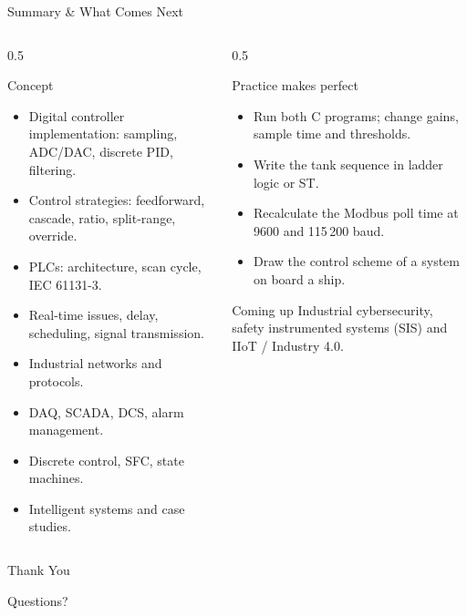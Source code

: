 \documentclass[aspectratio=169]{beamer}
\begin{document}
	\begin{frame}{Summary \& What Comes Next}
		\begin{columns}[T]
			\begin{column}{0.5\textwidth}
				\begin{block}{Concept}
					\begin{itemize}\small
						\item Digital controller implementation: sampling, ADC/DAC, discrete PID, filtering.
						\item Control strategies: feedforward, cascade, ratio, split-range, override.
						\item PLCs: architecture, scan cycle, IEC 61131-3.
						\item Real-time issues, delay, scheduling, signal transmission.
						\item Industrial networks and protocols.
						\item DAQ, SCADA, DCS, alarm management.
						\item Discrete control, SFC, state machines.
						\item Intelligent systems and case studies.
					\end{itemize}
				\end{block}
			\end{column}
			\begin{column}{0.5\textwidth}
				\begin{block}{Practice makes perfect}
					\begin{itemize}\small
						\item Run both C programs; change gains, sample time and thresholds.
						\item Write the tank sequence in ladder logic or ST.
						\item Recalculate the Modbus poll time at 9600 and 115\,200 baud.
						\item Draw the control scheme of a system on board a ship.
					\end{itemize}
				\end{block}
				\begin{block}{Coming up}
					\small Industrial cybersecurity, safety instrumented systems (SIS) and IIoT / Industry 4.0.
				\end{block}
			\end{column}
		\end{columns}
	\end{frame}

	\begin{frame}
		\centering
		\Huge Thank You
		\vspace{0.5cm}

		\normalsize Questions?
	\end{frame}

\end{document}
